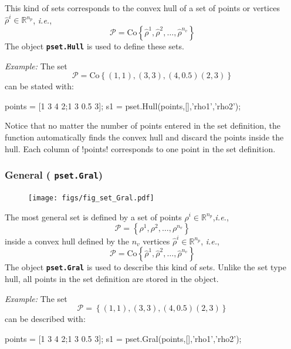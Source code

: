 \documentclass[fleqn,11pt]{article}
\newcommand{\lcode}[1]{\textbf{%
    \lstinline[style=mystyle]{#1}}}
\newcommand{\p}{\rho}
\newcommand{\Rset}{\mathbb{R}}
\newcommand{\Pset}{\mathcal{P}}
\newcommand{\ie}{{\em i.e.}\xspace}
\newcommand{\example}{\noindent\emph{Example:}\xspace}
\begin{document}
This kind of sets corresponds to the convex hull of a set of points or vertices $\hat{\p}^i\in\Rset^{n_p}$, \ie,
\begin{equation*}
    \Pset = \mathrm{Co}\left\{\hat{\p}^1,\hat{\p}^2,\dots,\hat{\p}^{n_v}\right\}
\end{equation*}
The object \lcode{pset.Hull} is used to define these sets.

\example The set
\begin{equation*}
    \Pset = \mathrm{Co}\left\{(1,1),(3,3),(4,0.5)(2,3)\right\}
\end{equation*}
can be stated with:
\begin{code}
points = [1 3 4 2;1 3 0.5 3];
s1 = pset.Hull(points,[],{'rho1','rho2'});
\end{code}
Notice that no matter the number of points entered in the set definition, the function automatically finds the convex hull and discard the points inside the hull. Each column of !points! corresponds to one point in the set definition.

\subsubsection{General (\texorpdfstring{\lcode{pset.Gral}}{pset.Gral})}\label{sssec:gral}

\begin{figure}
  \vspace{-5ex}
  \centering
  \texttt{[image: figs/fig\_set\_Gral.pdf]}
\end{figure}

The most general set is defined by a set of points $\p^i\in\Rset^{n_p}$,\ie,
\begin{equation*}
    \Pset = \left\{\p^1,\p^2,\dots,\p^{n_v}\right\}
\end{equation*}
inside a convex hull defined by the $n_v$ vertices $\hat{\p}^i\in\Rset^{n_p}$, \ie,
\begin{equation*}
    \Pset = \mathrm{Co}\left\{\hat{\p}^1,\hat{\p}^2,\dots,\hat{\p}^{n_v}\right\}
\end{equation*}
The object \lcode{pset.Gral} is used to describe this kind of sets. Unlike the set type hull, all points in the set definition are stored in the object.

\example The set
\begin{equation*}
    \Pset = \left\{(1,1),(3,3),(4,0.5)(2,3)\right\}
\end{equation*}
can be described with:
\begin{code}
points = [1 3 4 2;1 3 0.5 3];
s1 = pset.Gral(points,[],{'rho1','rho2'});
\end{code}
\end{document}

